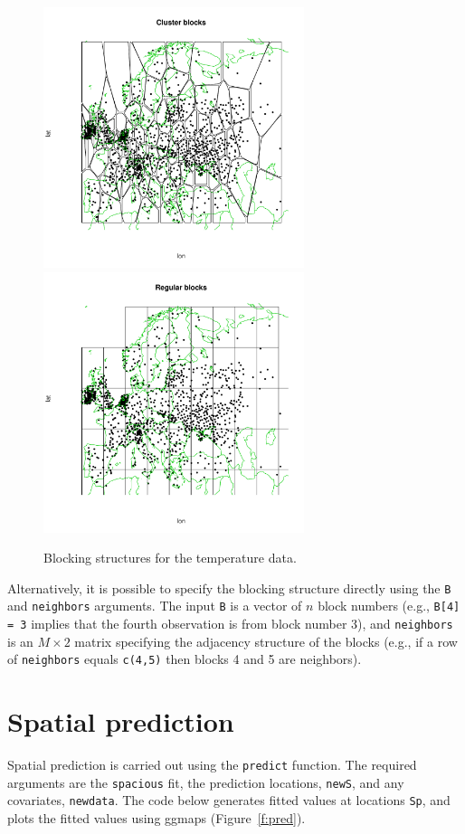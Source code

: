 \documentclass[11pt]{article}
\begin{document}
\begin{figure}
	\caption{Blocking structures for the temperature data.}\label{f:blocks}
	\centering
	\includegraphics[width=3in]{figures/blocks_c.pdf}
	\includegraphics[width=3in]{figures/blocks_r.pdf}
\end{figure}

Alternatively, it is possible to specify the blocking structure directly using the {\tt B} and {\tt neighbors} arguments.
The input {\tt B} is a vector of $n$ block numbers (e.g., {\tt B[4] = 3} implies that the fourth observation is from block number 3), and {\tt neighbors} is an $M\times 2$ matrix specifying the adjacency structure of the blocks (e.g., if a row of {\tt neighbors} equals {\tt c(4,5)} then blocks 4 and 5 are neighbors).

\section{Spatial prediction}\label{s:predict}

Spatial prediction is carried out using the {\tt predict} function.
The required arguments are the {\tt spacious} fit, the prediction locations, {\tt newS}, and any covariates, {\tt newdata}.
The code below generates fitted values at locations {\tt Sp}, and plots the fitted values using ggmaps (Figure~\ref{f:pred}).
\end{document}
